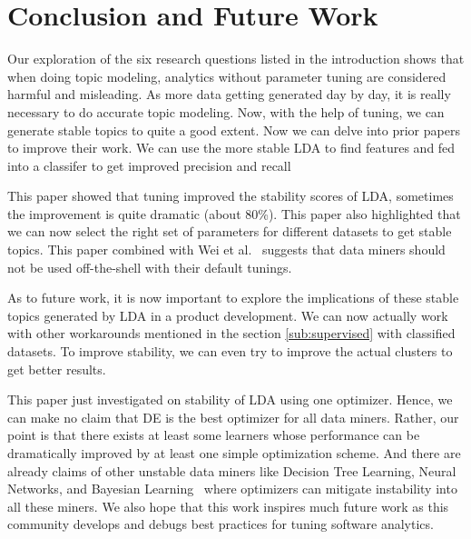 \documentclass[10pt,conference]{IEEEtran}
\theoremstyle{break}
\begin{document}
\section{Conclusion and Future Work}

Our exploration of the six research questions listed in the introduction shows that when doing topic modeling, analytics without parameter tuning are considered harmful and misleading. As more data getting generated day by day, it is really necessary to do accurate topic modeling. Now, with the help of tuning, we can generate stable topics to quite a good extent. Now we can delve into prior papers to improve their work. We can use the more stable LDA to find features and fed into a classifer to get improved precision and recall~\cite{chen2016topic,restificar2012inferring}

This paper showed that tuning improved the stability scores of LDA, sometimes the improvement is quite dramatic (about 80\%). This paper also highlighted that we can now select the right set of parameters for different datasets to get stable topics. This paper combined with Wei et al.~\cite{fu2016tuning} suggests that data miners should not be used off-the-shell with their default tunings.

As to future work, it is now important to explore the implications of these stable topics generated by LDA in a product development. We can now actually work with other workarounds mentioned in the section \ref{sub:supervised} with classified datasets. To improve stability, we can even try to improve the actual clusters to get better results.

This paper just investigated on stability of LDA using one optimizer. Hence, we can make no claim that DE is the best optimizer for all data miners. Rather, our point is that there exists at least some learners whose performance can be dramatically improved by at least one simple optimization scheme. And there are already claims of other unstable data miners like Decision Tree Learning, Neural Networks, and Bayesian Learning~\cite{zhang2005machine} where optimizers can mitigate instability into all these miners. We also hope that this work inspires much future work as this community develops and debugs best practices for tuning software analytics.



\medskip



\end{document}

